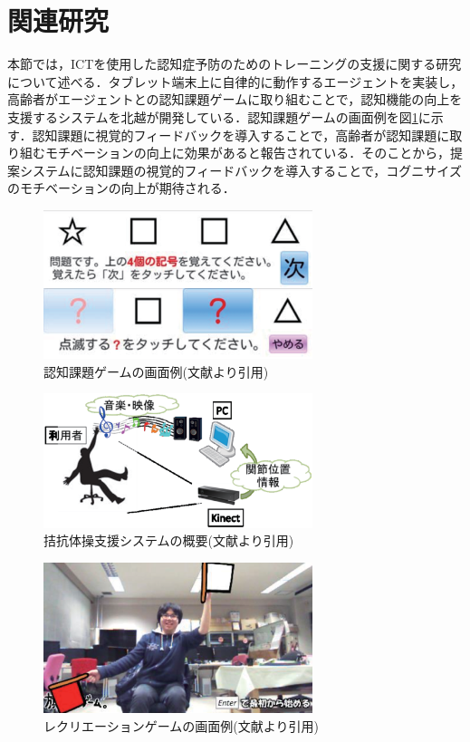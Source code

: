 \section{関連研究}
本節では，ICTを使用した認知症予防のためのトレーニングの支援に関する研究について述べる．タブレット端末上に自律的に動作するエージェントを実装し，高齢者がエージェントとの認知課題ゲームに取り組むことで，認知機能の向上を支援するシステム\cite{記憶力ゲーム}を北越が開発している．認知課題ゲームの画面例を図\ref{fig:cognition_system}に示す．認知課題に視覚的フィードバックを導入することで，高齢者が認知課題に取り組むモチベーションの向上に効果があると報告されている．そのことから，提案システムに認知課題の視覚的フィードバックを導入することで，コグニサイズのモチベーションの向上が期待される．

\begin{figure}[tbp]
	\centering
			\includegraphics[width=0.7\textwidth]{chap1-figure/cognition_system.eps}
	\caption{認知課題ゲームの画面例(文献\cite{記憶力ゲーム}より引用)}
	\label{fig:cognition_system}
\end{figure}

\begin{figure}[tbp]
	\centering
			\includegraphics[width=0.7\textwidth]{chap1-figure/antagonism_system.eps}
	\caption{拮抗体操支援システムの概要(文献より引用)}
	\label{fig:antagonism_system}
\end{figure}

\begin{figure}[tbp]
	\centering
			\includegraphics[width=0.7\textwidth]{chap1-figure/upper_limbs_system.eps}
	\caption{レクリエーションゲームの画面例(文献より引用)}
	\label{fig:upper_limbs_system}
\end{figure}


